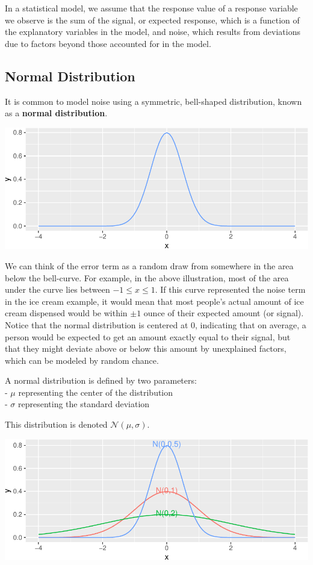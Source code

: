 \documentclass[
  letterpaper,
  DIV=11,
  numbers=noendperiod]{scrreprt}
\begin{document}
In a statistical model, we assume that the response value of a response
variable we observe is the sum of the signal, or expected response,
which is a function of the explanatory variables in the model, and
noise, which results from deviations due to factors beyond those
accounted for in the model.

\subsection{Normal Distribution}\label{normal-distribution}

It is common to model noise using a symmetric, bell-shaped distribution,
known as a \textbf{normal distribution}.

\includegraphics{Ch4_files/figure-pdf/unnamed-chunk-6-1.pdf}

We can think of the error term as a random draw from somewhere in the
area below the bell-curve. For example, in the above illustration, most
of the area under the curve lies between \(-1\leq x\leq 1\). If this
curve represented the noise term in the ice cream example, it would mean
that most people's actual amount of ice cream dispensed would be within
\(\pm 1\) ounce of their expected amount (or signal). Notice that the
normal distribution is centered at 0, indicating that on average, a
person would be expected to get an amount exactly equal to their signal,
but that they might deviate above or below this amount by unexplained
factors, which can be modeled by random chance.

A normal distribution is defined by two parameters:\\
- \(\mu\) representing the center of the distribution\\
- \(\sigma\) representing the standard deviation

This distribution is denoted \(\mathcal{N}(\mu, \sigma)\).

\includegraphics{Ch4_files/figure-pdf/unnamed-chunk-8-1.pdf}
\end{document}
